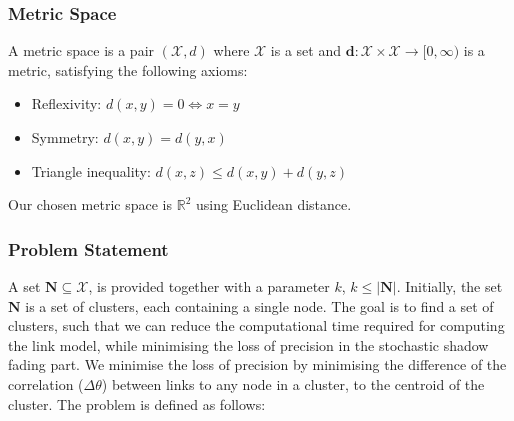 \subsubsection{Metric Space}
A metric space is a pair $( \mathcal{X}, d )$ where $ \mathcal{X} $ is a set and $\textbf{d}:\mathcal{X} \times \mathcal{X} \rightarrow [0, \infty )$ is a metric, satisfying the following axioms:

\begin{itemize}
    \item Reflexivity: $d(x, y) = 0 \Longleftrightarrow x = y$
    \item Symmetry: $d(x, y) = d(y, x)$
    \item Triangle inequality: $d(x, z) \leq d(x, y) + d(y, z)$
\end{itemize}

Our chosen metric space is $\mathbb{R}^2$ using Euclidean distance.


\subsubsection{Problem Statement}

A set $\textbf{N} \subseteq \mathcal{X}$, is provided together with a parameter $k$, $k \leq |\textbf{N}|$. Initially, the set $\textbf{N}$ is a set of clusters, each containing a single node. The goal is to find a set of clusters, such that we can reduce the computational time required for computing the link model, while minimising the loss of precision in the stochastic shadow fading part. We minimise the loss of precision by minimising the difference of the correlation ($\Delta\theta$) between links to any node in a cluster, to the centroid of the cluster. The problem is defined as follows: \smallbreak




